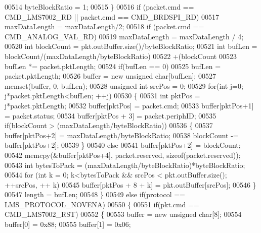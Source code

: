 \begin{DoxyCode}
{{{{{00514             byteBlockRatio = 1;
00515         \}
00516         \textcolor{keywordflow}{if} (packet.cmd == CMD_LMS7002_RD || packet.cmd == CMD_BRDSPI_RD)
00517             maxDataLength = maxDataLength/2;
00518         \textcolor{keywordflow}{if} (packet.cmd == CMD_ANALOG_VAL_RD)
00519             maxDataLength = maxDataLength / 4;
00520         \textcolor{keywordtype}{int} blockCount = pkt.outBuffer.size()/byteBlockRatio;
00521         \textcolor{keywordtype}{int} bufLen = blockCount/(maxDataLength/byteBlockRatio)
00522                     +(blockCount%
00523         bufLen *= packet.pktLength;
00524         \textcolor{keywordflow}{if}(bufLen == 0)
00525             bufLen = packet.pktLength;
00526         buffer = \textcolor{keyword}{new} \textcolor{keywordtype}{unsigned} \textcolor{keywordtype}{char}[bufLen];
00527         memset(buffer, 0, bufLen);
00528         \textcolor{keywordtype}{unsigned} \textcolor{keywordtype}{int} srcPos = 0;
00529         \textcolor{keywordflow}{for}(\textcolor{keywordtype}{int} j=0; j*packet.pktLength<bufLen; ++j)
00530         \{
00531             \textcolor{keywordtype}{int} pktPos = j*packet.pktLength;
00532             buffer[pktPos] = packet.cmd;
00533             buffer[pktPos+1] = packet.status;
00534             buffer[pktPos + 3] = packet.periphID;
00535             \textcolor{keywordflow}{if}(blockCount > (maxDataLength/byteBlockRatio))
00536             \{
00537                 buffer[pktPos+2] = maxDataLength/byteBlockRatio;
00538                 blockCount -= buffer[pktPos+2];
00539             \}
00540             \textcolor{keywordflow}{else}
00541                 buffer[pktPos+2] = blockCount;
00542             memcpy(&buffer[pktPos+4], packet.reserved, \textcolor{keyword}{sizeof}(packet.reserved));
00543             \textcolor{keywordtype}{int} bytesToPack = (maxDataLength/byteBlockRatio)*byteBlockRatio;
00544             \textcolor{keywordflow}{for} (\textcolor{keywordtype}{int} k = 0; k<bytesToPack && srcPos < pkt.outBuffer.size(); ++srcPos, ++
      k)
00545                 buffer[pktPos + 8 + k] = pkt.outBuffer[srcPos];
00546         \}
00547         length = bufLen;
00548     \}
00549     \textcolor{keywordflow}{else} \textcolor{keywordflow}{if}(protocol == LMS_PROTOCOL_NOVENA)
00550     \{
00551         \textcolor{keywordflow}{if}(pkt.cmd == CMD_LMS7002_RST)
00552         \{
00553             buffer = \textcolor{keyword}{new} \textcolor{keywordtype}{unsigned} \textcolor{keywordtype}{char}[8];
00554             buffer[0] = 0x88;
00555             buffer[1] = 0x06;
}}}}}
\end{DoxyCode}
